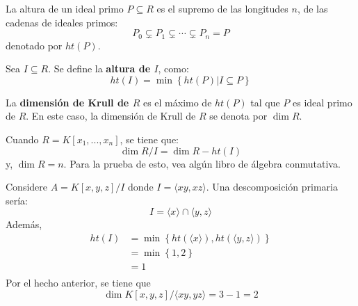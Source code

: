 \documentclass[12pt]{report}
\newcounter{it}
\theoremstyle{largebreak}
\begin{document}
    \begin{mydef}
        La altura de un ideal primo $P\subseteq R$ es el supremo de las longitudes $n$, de las cadenas de ideales primos:
        \begin{equation*}
            P_0\subsetneq P_1\subsetneq\cdots\subsetneq P_n=P
        \end{equation*}
        denotado por $ht(P)$.
    \end{mydef}

    \begin{mydef}
        Sea $I\subseteq R$. Se define la \textbf{altura de $I$}, como:
        \begin{equation*}
            ht(I)=\min\left\{ht(P)\Big|I\subseteq P \right\}
        \end{equation*}
    \end{mydef}

    \begin{mydef}
        La \textbf{dimensión de Krull de $R$} es el máximo de $ht(P)$ tal que $P$ es ideal primo de $R$. En este caso, la dimensión de Krull de $R$ se denota por $\dim R$.
    \end{mydef}

    Cuando $R=K[x_1,...,x_n]$, se tiene que:
    \begin{equation*}
        \dim R/I=\dim R-ht(I)
    \end{equation*}
    y, $\dim R=n$. Para la prueba de esto, vea algún libro de álgebra conmutativa.

    \begin{exa}
        Considere $A=K[x,y,z]/I$ donde $I=\langle xy,xz\rangle$. Una descomposición primaria sería:
        \begin{equation*}
            I=\langle x\rangle\cap\langle y,z\rangle
        \end{equation*}
        Además,
        \begin{equation*}
            \begin{split}
                ht(I)&=\min\left\{ht(\langle x\rangle),ht(\langle y,z\rangle)\right\}\\
                &=\min\left\{1,2 \right\}\\
                &=1\\
            \end{split}
        \end{equation*}
        Por el hecho anterior, se tiene que
        \begin{equation*}
            \dim K[x,y,z]/\langle xy,yz\rangle=3-1=2
        \end{equation*}
    \end{exa}
\end{document}
